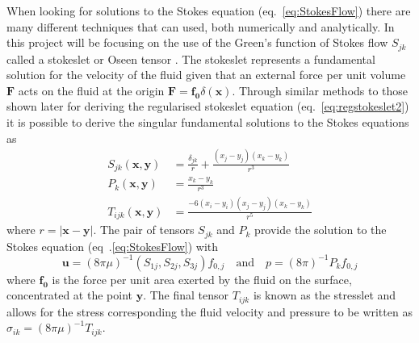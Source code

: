 When looking for solutions to the Stokes equation (eq.~\ref{eq:StokesFlow}) there are many different techniques that can used, both numerically and analytically. In this project will be focusing on the use of the Green's function of Stokes flow $S_{jk}$ called a stokeslet\cite{Pozrikidis1992BoundaryFlow,Hancock1953TheLiquids} or Oseen tensor \cite{Oseen1927NeuereHydrodynamik}. The stokeslet represents a fundamental solution for the velocity of the fluid given that an external force per unit volume $\bm{F}$ acts on the fluid at the origin $\bm{F} = \bm{f_0}\delta(\bm{x})$\cite{Hancock1953TheLiquids, Batchelor2000AnDynamics}.
Through similar methods to those shown later for deriving the regularised stokeslet equation (eq.~\ref{eq:regstokeslet2}) it is possible to derive the singular fundamental solutions to the Stokes equations as
\begin{equation}
\label{eq:singularsolutions}
\begin{aligned}
    S_{j k}(\bm{x}, \bm{y}) &= \frac{\delta_{j k}}{r}+\frac{\left(x_{j}-y_{j}\right)\left(x_{k}-y_{k}\right)}{r^{3}} \\
    P_{k}(\bm{x}, \bm{y}) &= \frac{x_{k}-y_{k}}{r^{3}} \\
    T_{ijk}(\bm{x}, \bm{y}) &= \frac{-6\left(x_{i}-y_{i}\right)\left(x_{j}-y_{j}\right)\left(x_{k}-y_{k}\right)}{r^5}
\end{aligned}
\end{equation}
where $r=|\bm{x}-\bm{y}|$. The pair of tensors $S_{jk}$ and $P_k$ provide the solution to the Stokes equation (eq~.\ref{eq:StokesFlow}) with
\begin{equation*}
    \mathbf{u} = (8 \pi \mu)^{-1} \left(S_{1j},S_{2j},S_{3j}\right)f_{0,j} \quad \text{and} \quad p = (8 \pi)^{-1} P_k f_{0,j} 
\end{equation*}
where $\bm{f_{0}}$ is the force per unit area exerted by the fluid on the surface, concentrated at the point $\bm{y}$. The final tensor $T_{ijk}$ is known as the stresslet and allows for the stress corresponding the fluid velocity and pressure to be written as $\sigma_{ik}=(8 \pi \mu)^{-1}T_{ijk}$. 

